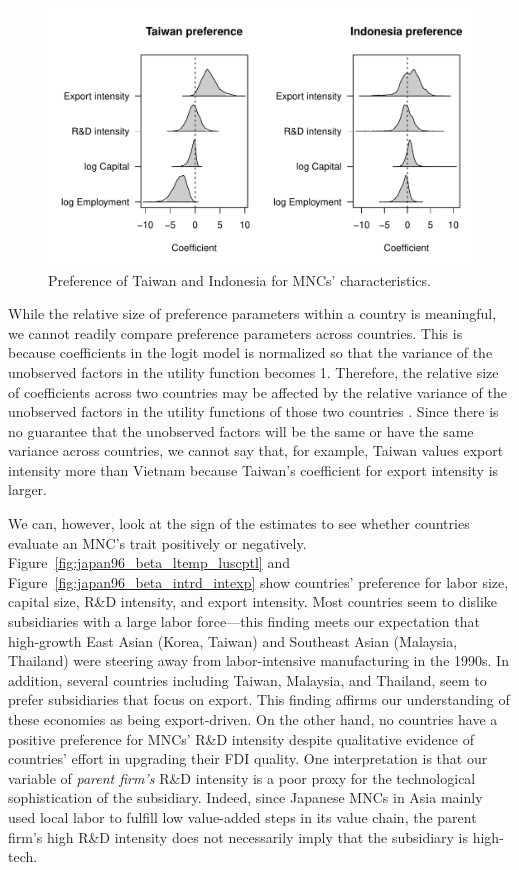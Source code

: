 \begin{figure}[tbp]
  \centering
  \includegraphics[width=\textwidth,keepaspectratio]{../figure/japan96_beta_Taiwan_Indonesia}
  \caption[Preference of Taiwan and Indonesia.]{Preference of Taiwan and
    Indonesia for MNCs' characteristics.}
  \label{fig:japan96_beta_Taiwan_Indonesia}
\end{figure}

While the relative size of preference parameters within a country is meaningful,
we cannot readily compare preference parameters across countries. This is
because coefficients in the logit model is normalized so that the variance of
the unobserved factors in the utility function becomes 1. Therefore, the
relative size of coefficients across two countries may be affected by the
relative variance of the unobserved factors in the utility functions of those
two countries \citep[chap. 2]{Train2009}. Since there is no guarantee that the
unobserved factors will be the same or have the same variance across countries,
we cannot say that, for example, Taiwan values export intensity more than
Vietnam because Taiwan's coefficient for export intensity is larger.

We can, however, look at the sign of the estimates to see whether countries
evaluate an MNC's trait positively or negatively.
Figure~\ref{fig:japan96_beta_ltemp_luscptl} and
Figure~\ref{fig:japan96_beta_intrd_intexp} show countries' preference for labor
size, capital size, R\&D intensity, and export intensity. Most countries seem to
dislike subsidiaries with a large labor force---this finding meets our
expectation that high-growth East Asian (Korea, Taiwan) and Southeast Asian
(Malaysia, Thailand) were steering away from labor-intensive manufacturing in
the 1990s. In addition, several countries including Taiwan, Malaysia, and
Thailand, seem to prefer subsidiaries that focus on export. This finding affirms
our understanding of these economies as being export-driven. On the other hand,
no countries have a positive preference for MNCs' R\&D intensity despite
qualitative evidence of countries' effort in upgrading their FDI quality. One
interpretation is that our variable of \textit{parent firm's} R\&D intensity is
a poor proxy for the technological sophistication of the subsidiary. Indeed,
since Japanese MNCs in Asia mainly used local labor to fulfill low
value-added steps in its value chain, the parent firm's high R\&D intensity does
not necessarily imply that the subsidiary is high-tech.

